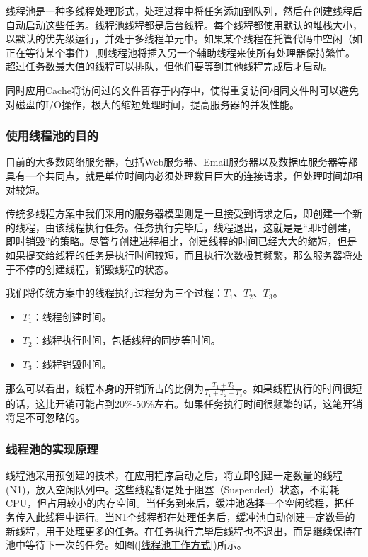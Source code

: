 \documentclass[bachelor]{thesis-uestc}
\begin{document}
线程池是一种多线程处理形式，处理过程中将任务添加到队列，然后在创建线程后自动启动这些任务。线程池线程都是后台线程。每个线程都使用默认的堆栈大小，以默认的优先级运行，并处于多线程单元中。如果某个线程在托管代码中空闲（如正在等待某个事件）,则线程池将插入另一个辅助线程来使所有处理器保持繁忙。超过任务数最大值的线程可以排队，但他们要等到其他线程完成后才启动。

同时应用Cache将访问过的文件暂存于内存中，使得重复访问相同文件时可以避免对磁盘的I/O操作，极大的缩短处理时间，提高服务器的并发性能。

\subsubsection{使用线程池的目的}
目前的大多数网络服务器，包括Web服务器、Email服务器以及数据库服务器等都具有一个共同点，就是单位时间内必须处理数目巨大的连接请求，但处理时间却相对较短。 

传统多线程方案中我们采用的服务器模型则是一旦接受到请求之后，即创建一个新的线程，由该线程执行任务。任务执行完毕后，线程退出，这就是是“即时创建，即时销毁”的策略。尽管与创建进程相比，创建线程的时间已经大大的缩短，但是如果提交给线程的任务是执行时间较短，而且执行次数极其频繁，那么服务器将处于不停的创建线程，销毁线程的状态。

我们将传统方案中的线程执行过程分为三个过程：$T_1$、$T_2$、$T_3$。
\begin{itemize}
	\item $T_1$：线程创建时间。 
	\item $T_2$：线程执行时间，包括线程的同步等时间。 
	\item $T_3$：线程销毁时间。
\end{itemize}

那么可以看出，线程本身的开销所占的比例为$\frac{T_1+T_3}{T_1+T_2+T_3}$。如果线程执行的时间很短的话，这比开销可能占到20\%-50\%左右。如果任务执行时间很频繁的话，这笔开销将是不可忽略的。

\subsubsection{线程池的实现原理}

线程池采用预创建的技术，在应用程序启动之后，将立即创建一定数量的线程(N1)，放入空闲队列中。这些线程都是处于阻塞（Suspended）状态，不消耗CPU，但占用较小的内存空间。当任务到来后，缓冲池选择一个空闲线程，把任务传入此线程中运行。当N1个线程都在处理任务后，缓冲池自动创建一定数量的新线程，用于处理更多的任务。在任务执行完毕后线程也不退出，而是继续保持在池中等待下一次的任务。如图(\ref{线程池工作方式})所示。
\end{document}
